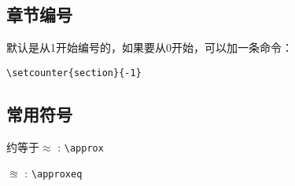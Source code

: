 \subsection{章节编号}
默认是从1开始编号的，如果要从0开始，可以加一条命令：\begin{verbatim}\setcounter{section}{-1}\end{verbatim}


\subsection{常用符号}
\begin{myitemize}
	\item 约等于$\approx$ : \verb|\approx|
	\item $\approxeq$ : \verb|\approxeq|
\end{myitemize}






